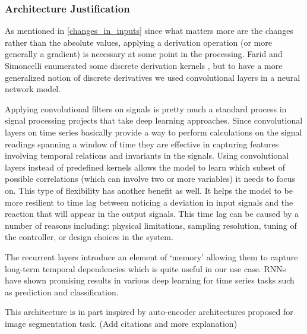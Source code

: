 \subsubsection{Architecture Justification}
As mentioned in \ref{changes_in_inputs} since what matters more are the changes rather than the absolute values, applying a derivation operation (or more generally a gradient) is necessary at some point in the processing. 
Farid and Simoncelli enumerated some discrete derivation kernels \cite{Farid2004}, but to have a more generalized notion of discrete derivatives we used convolutional layers in a neural network model. 

Applying convolutional filters on signals is pretty much a standard process in signal processing projects that take deep learning approaches.  \cite{morales2016deep, zeng2014convolutional, yang2015deep} Since convolutional layers on time series basically provide a way to perform calculations on the signal readings spanning a window of time they are effective in capturing features involving temporal relations and invariants in the signals. \cite{wang2017time} 
Using convolutional layers instead of predefined kernels allows the model to learn which subset of possible correlations (which can involve two or more variables) it needs to focus on. This type of flexibility has another benefit as well. It helps the model to be more resilient to time lag between noticing a deviation in input signals and the reaction that will appear in the output signals. This time lag can be caused by a number of reasons including: physical limitations, sampling resolution, tuning of the controller, or design choices in the system.

The recurrent layers introduce an element of `memory' allowing them to capture long-term temporal dependencies which is quite useful in our use case. \cite{Che2018} RNNs have shown promising results in various deep learning for time series tasks such as prediction and classification. \cite{wang2017time, murad2017deep, yang2015deep, Ordonez2016}

This architecture is in part inspired by auto-encoder architectures proposed for image segmentation task. (Add citations and more explanation)